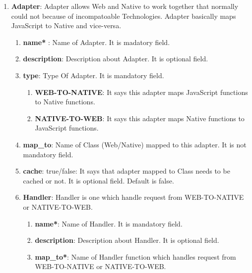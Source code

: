 \begin{enumerate}
	
	\item \small \textbf{Adapter}: Adapter allows Web and Native to work together that normally could not because of incompatoable Technologies. Adapter basically maps JavaScript to Native and vice-versa.
	
		\begin{enumerate}

			\item \small \textbf{name*} : Name of Adapter. It is madatory field.
			\item \small \textbf{description}: Description about Adapter. It is optional field.
			\item \small \textbf{type}: Type Of Adapter. It is mandatory field.

				\begin{enumerate}

					\item \small \textbf{WEB-TO-NATIVE}: It says this adapter maps JavaScript functions to Native functions.
		
					\item \small \textbf{NATIVE-TO-WEB}: It says this adapter maps Native functions to JavaScript functions.
					
				\end{enumerate}


			\item \small \textbf{map\_to}: Name of Class (Web/Native) mapped to this adapter. It is not mandatory field.

			\item \small \textbf{cache}: true/false: It says that adapter mapped to Class needs to be cached or not. It is optional field. Default is false.


				\item \small \textbf{Handler}: Handler is one which handle request from WEB-TO-NATIVE or NATIVE-TO-WEB.

				\begin{enumerate}

					\item \small \textbf{name*}: Name of Handler. It is mandatory field.
					\item \small \textbf{description}: Description about Handler. It is optional field.
					\item\small \textbf{map\_to*}: Name of Handler function which handles request from WEB-TO-NATIVE or NATIVE-TO-WEB.


\end{enumerate}
\end{enumerate}
\end{enumerate}
